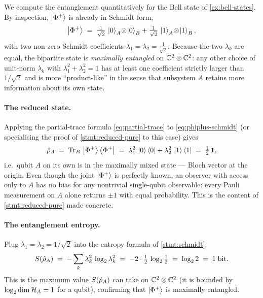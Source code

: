 \begin{example}
We compute the entanglement quantitatively for the Bell state of
\cref{ex:bell-states}. By inspection, $\ket{\Phi^+}$ is already in
Schmidt form,
\begin{equation}
\label{eq:phiplus-schmidt}
\ket{\Phi^+} \;=\; \tfrac{1}{\sqrt2}\,\ket{0}_A\!\otimes\!\ket{0}_B
                 + \tfrac{1}{\sqrt2}\,\ket{1}_A\!\otimes\!\ket{1}_B,
\end{equation}
with two non-zero Schmidt coefficients
$\lambda_1=\lambda_2=\tfrac{1}{\sqrt2}$. Because the two
$\lambda_k$ are equal, the bipartite state is \emph{maximally
entangled} on $\mathbb{C}^2\otimes\mathbb{C}^2$: any other choice of unit-norm
$\lambda_k$ with $\lambda_1^2+\lambda_2^2=1$ has at least one
coefficient strictly larger than $1/\sqrt 2$ and is more
``product-like'' in the sense that subsystem $A$ retains more
information about its own state.

\paragraph{The reduced state.}
Applying the partial-trace formula \cref{eq:partial-trace} to
\cref{eq:phiplus-schmidt} (or specialising the proof of
\cref{stmt:reduced-pure} to this case) gives
\begin{equation}
\hat{\rho}_A \;=\; \operatorname{Tr}_B\,\ket{\Phi^+}\bra{\Phi^+}
              \;=\; \lambda_1^2\,\ket{0}\bra{0}
                  + \lambda_2^2\,\ket{1}\bra{1}
              \;=\; \tfrac12\,\mathbf{1},
\end{equation}
i.e.\ qubit $A$ on its own is in the maximally mixed state ---
Bloch vector at the origin. Even though the joint $\ket{\Phi^+}$
is perfectly known, an observer with access only to $A$ has no
bias for any nontrivial single-qubit observable: every Pauli
measurement on $A$ alone returns $\pm 1$ with equal probability.
This is the content of \cref{stmt:reduced-pure} made concrete.

\paragraph{The entanglement entropy.}
Plug $\lambda_1=\lambda_2=1/\sqrt 2$ into the entropy formula of
\cref{stmt:schmidt}:
\begin{equation}
S(\hat{\rho}_A)
\;=\; -\sum_k \lambda_k^2\,\log_2 \lambda_k^2
\;=\; -2\cdot\tfrac12\,\log_2\tfrac12
\;=\; \log_2 2 \;=\; 1\;\text{bit}.
\end{equation}
This is the maximum value $S(\hat{\rho}_A)$ can take on
$\mathbb{C}^2\otimes\mathbb{C}^2$ (it is bounded by $\log_2\dim\mathcal{H}_A=1$ for a
qubit), confirming that $\ket{\Phi^+}$ is maximally entangled.


\end{example}
